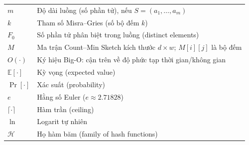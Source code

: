 \begin{longtable}{@{}p{3.5cm} p{10cm}@{}}

$m$                      & Độ dài luồng (số phần tử), nếu $S=(a_1,\ldots,a_m)$ \\
$k$                      & Tham số Misra--Gries (số bộ đếm $k$) \\
$F_0$                    & Số phần tử phân biệt trong luồng (distinct elements) \\
$M$                      & Ma trận Count--Min Sketch kích thước $d\times w$; $M[i][j]$ là bộ đếm \\
$O(\cdot)$               & Ký hiệu Big-O: cận trên về độ phức tạp thời gian/không gian \\
$\mathbb{E}[\cdot]$     & Kỳ vọng (expected value) \\
$\Pr[\cdot]$             & Xác suất (probability) \\
$e$                      & Hằng số Euler ($e\approx 2.71828$) \\
$\lceil \cdot \rceil$    & Hàm trần (ceiling) \\
$\ln$                    & Logarit tự nhiên \\
$\mathcal{H}$            & Họ hàm băm (family of hash functions) \\

\end{longtable}
